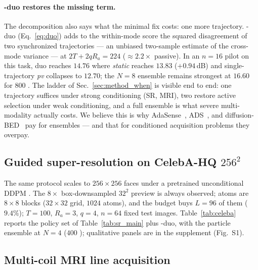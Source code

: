 \paragraph{\pvas-duo restores the missing term.} The decomposition also
says what the minimal fix costs: one more trajectory. \pvas-duo
(Eq.~\ref{eq:duo}) adds to the within-mode score the squared
disagreement of two synchronized trajectories --- an unbiased
two-sample estimate of the cross-mode variance --- at
$2T{+}2qR_a{=}224$ \nfe{} (${\approx}2.2\times$ passive). In an
$n{=}16$ pilot on this task\RLOCAL{}, duo reaches $14.76$ \psnrm{}
where \emph{static} reaches $13.83$ ($+0.94$\,dB) and
single-trajectory \emph{pv} collapses to $12.70$; the $N{=}8$ ensemble
remains strongest at $16.60$ for $800$ \nfe. The ladder of
Sec.~\ref{sec:method_when} is visible end to end: one trajectory
suffices under strong conditioning (SR, MRI), two restore active
selection under weak conditioning, and a full ensemble is what severe
multi-modality actually costs. We believe this is why
AdaSense~\cite{elata2024adasense}, ADS~\cite{nolan2025ads}, and
diffusion-BED~\cite{iollo2025bedmri} pay for ensembles --- and that for
conditioned acquisition problems they overpay.

\subsection{Guided super-resolution on CelebA-HQ
$256^2$}\label{sec:exp_celeba}

The same protocol scales to $256{\times}256$ faces
\cite{karras2018progressive} under a pretrained unconditional DDPM
\cite{ho2020ddpm}. The $8\times$ box-downsampled $32^2$ preview is
always observed; atoms are $8{\times}8$ blocks ($32{\times}32$ grid,
$1024$ atoms), and the budget buys $L{=}96$ of them ($9.4\%$);
$T{=}100$, $R_a{=}3$, $q{=}4$, $n{=}64$ fixed test images.
Table~\ref{tab:celeba} reports the policy set of
Table~\ref{tab:sr_main} plus \pvas-duo, with the particle ensemble at
$N{=}4$ ($400$ \nfe); qualitative panels are in the supplement
(Fig.~S1).


\subsection{Multi-coil MRI line acquisition}\label{sec:exp_mri}

